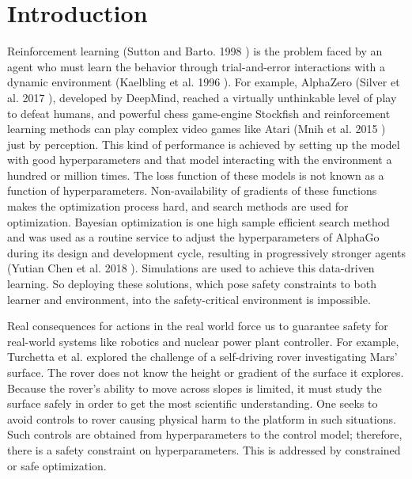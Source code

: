 \chapter{Introduction}\label{ch:introduction}
Reinforcement learning (Sutton and Barto. 1998 \cite{Sutton1998}) is the problem faced by an agent who must learn the behavior through trial-and-error interactions with a dynamic environment (Kaelbling et al. 1996 \cite{Littman1996}).
For example, AlphaZero (Silver et al. 2017 \cite{silver2017mastering}), developed by DeepMind, reached a virtually unthinkable level of play to defeat humans, and powerful chess game-engine Stockfish and reinforcement learning methods can play complex video games like Atari (Mnih et al. 2015 \cite{mnih2015humanlevel}) just by perception. 
This kind of performance is achieved by setting up the model with good hyperparameters and that model interacting with the environment a hundred or million times. 
The loss function of these models is not known as a function of hyperparameters. 
Non-availability of gradients of these functions makes the optimization process hard, and search methods are used for optimization. 
Bayesian optimization is one high sample efficient search method and was used as a routine service to adjust the hyperparameters of AlphaGo during its design and development cycle, resulting in progressively stronger agents (Yutian Chen et al. 2018 \cite{chen2018bayesian}).
Simulations are used to achieve this data-driven learning. 
So deploying these solutions, which pose safety constraints to both learner and environment, into the safety-critical environment is impossible.

Real consequences for actions in the real world force us to guarantee safety for real-world systems like robotics and nuclear power plant controller. 
For example, Turchetta et al.\cite{TurchettaB016} explored the challenge of a self-driving rover investigating Mars' surface.
The rover does not know the height or gradient of the surface it explores. 
Because the rover's ability to move across slopes is limited, it must study the surface safely in order to get the most scientific understanding. 
One seeks to avoid controls to rover causing physical harm to the platform in such situations. Such controls are obtained from hyperparameters to the control model; therefore, there is a safety constraint on hyperparameters. This is addressed by constrained or safe optimization.

